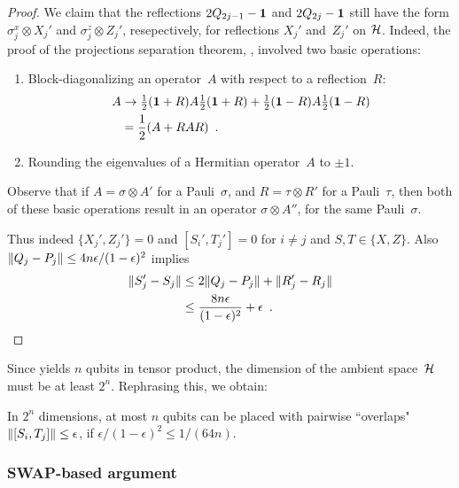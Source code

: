 \documentclass[preprintnumbers,11pt,onecolumn]{article}
\begin{document}
\begin{proof}
We claim that the reflections $2 Q_{2j-1} - \boldsymbol{1}$ and $2 Q_{2j} - \boldsymbol{1}$ still have the form $\sigma_j^x \otimes X_j'$ and $\sigma_j^z \otimes Z_j'$, resepectively, for reflections $X_j'$ and~$Z_j'$ on ${\mathcal H}$.  Indeed, the proof of the projections separation theorem, , involved two basic operations: 
\begin{enumerate}
\item Block-diagonalizing an operator~$A$ with respect to a reflection~$R$: 
\begin{align*}
A
&\rightarrow \tfrac12 (\boldsymbol{1} + R) A \tfrac12 (\boldsymbol{1} + R) + \tfrac12 (\boldsymbol{1} - R) A \tfrac12 (\boldsymbol{1} - R) \\
&= \frac12 (A + R A R)
 \enspace .
\end{align*}
\item Rounding the eigenvalues of a Hermitian operator~$A$ to $\pm 1$.  
\end{enumerate}
Observe that if $A = \sigma \otimes A'$ for a Pauli~$\sigma$, and $R = \tau \otimes R'$ for a Pauli~$\tau$, then both of these basic operations result in an operator $\sigma \otimes A''$, for the same Pauli~$\sigma$.  

Thus indeed $\{X_j', Z_j'\} = 0$ and $[S_i', T_j'] = 0$ for $i \neq j$ and $S, T \in \{X, Z\}$.  Also ${\| Q_j - P_j \|} \leq 4 n \epsilon / (1-\epsilon)^2$ implies 
\begin{align*}
{\| S_j' - S_j \|} 
&\leq 2 {\| Q_j - P_j \|} + {\| R_j' - R_j \|} \\
&\leq \frac{8 n \epsilon}{(1-\epsilon)^2} + \epsilon
 \enspace . \qedhere
\end{align*} 
\end{proof}

Since  yields $n$ qubits in tensor product, the dimension of the ambient space~${\mathcal H}$ must be at least $2^n$.  Rephrasing this, we obtain: 

\begin{corollary}
In $2^n$ dimensions, at most $n$ qubits can be placed with pairwise ``overlaps" ${\| [S_i, T_j] \|} \leq \epsilon$, if $\epsilon / (1-\epsilon)^2 \leq 1/(64 n)$.  
\end{corollary}


\subsubsection{SWAP-based argument} \label{s:swapnorm}
\end{document}
